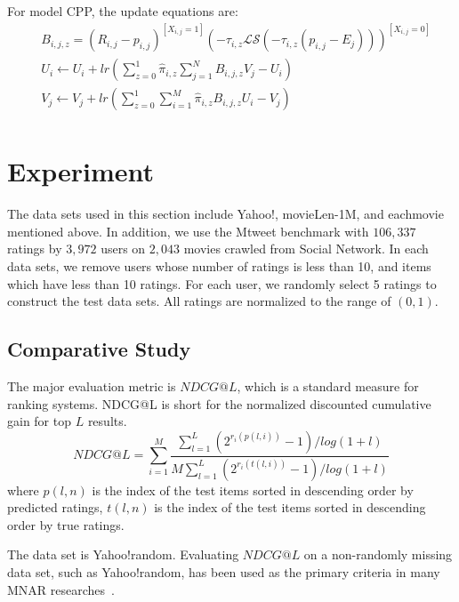\documentclass{sig-alternate}
\begin{document}
For model CPP, the update equations are:
\begin{equation}
\begin{split}
&B_{i,j,z}=(R_{i,j}-p_{i,j})^{[X_{i,j}=1]}(-\tau_{i,z}\mathcal{LS}(-\tau_{i,z}(p_{i,j}-E_{j})))^{[X_{i,j}=0]} \\
&U_{i}\leftarrow U_{i}+lr(\sum\limits_{z=0}^{1}\hat{\pi}_{i,z}\sum\limits_{j=1}^{N}B_{i,j,z}V_j-U_{i}) \\
&V_j\leftarrow V_j+lr(\sum\limits_{z=0}^{1}\sum\limits_{i=1}^{M}\hat{\pi}_{i,z}B_{i,j,z}U_{i}-V_j) \\
\end{split}
\end{equation}

\section{Experiment}\label{sec:experiment}

The data sets used in this section include Yahoo!, movieLen-1M, and eachmovie mentioned above. In addition, we use the Mtweet benchmark with $106,337$ ratings by $3,972$ users on $2,043$ movies crawled from Social Network. In each data sets, we remove users whose number of ratings is less than 10, and items which have less than 10 ratings. For each user, we randomly select 5 ratings to construct the test data sets. All ratings are normalized to the range of $(0,1)$.


\subsection{Comparative Study}

The major evaluation metric is $NDCG@L$, which is a standard measure for ranking systems.   NDCG@L is short for the normalized discounted cumulative gain for top $L$ results. 
\begin{equation}
NDCG@L=\sum\limits_{i=1}^{M}\frac{\sum_{l=1}^{L}(2^{r_{i}(p(l,i))}-1)/log(1+l)}{M\sum_{l=1}^{L}(2^{r_{i}(t(l,i))}-1)/log(1+l)}
\end{equation}
where $p(l,n)$ is the index of the test items sorted in descending order by predicted ratings, $t(l,n)$ is the index of the test items sorted in descending order by true ratings.

The data set is Yahoo!random. Evaluating $NDCG@L$ on a non-randomly missing data set, such as Yahoo!random, has been used as the primary criteria in many MNAR researches~\cite{Hernandez-Lobato2014Probabilistic,Marlin2009Collaborative}.
\end{document}
